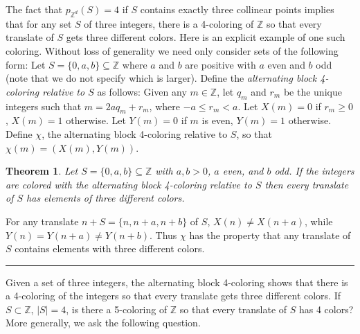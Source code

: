 \documentclass[12pt]{article}
\newenvironment{proof}{{\bf Proof:  }}{\hfill\rule{2mm}{2mm}}
\newtheorem{theorem}{Theorem}
\newcommand{\Z}{\ensuremath{\mathbb Z}}
\begin{document}
The fact that $p_{\Z^d}(S)=4$ if $S$ contains exactly three collinear points implies that for any set $S$ of three integers, there is a 4-coloring of $\Z$ so that every translate of $S$ gets three different colors. Here is an explicit example of one such coloring. Without loss of generality we need only consider sets of the following form: Let $S=\{0,a,b\} \subseteq \Z$ where $a$ and $b$ are positive with $a$ even and $b$ odd (note that we do not specify which is larger). Define the \textit{alternating block 4-coloring relative to $S$} as follows: Given any $m \in \Z$, let $q_m$ and $r_m$ be the unique integers such that $m=2aq_m+r_m$, where $-a\le r_m <a$. Let $X(m)=0$ if $r_m \ge 0$, $X(m)=1$ otherwise.  Let $Y(m)=0$ if $m$ is even, $Y(m)=1$ otherwise.  Define $\chi$, the alternating block 4-coloring relative to $S$, so that $\chi(m) = (X(m),Y(m))$. 

\begin{theorem}
Let  $S=\{0,a,b\} \subseteq \Z$ with $a, b >0$, $a$ even, and $b$ odd. If the integers are colored with the alternating block 4-coloring relative to $S$ then every translate of $S$ has elements of three different colors.
\end{theorem}
\begin{proof}
For any translate $n+S = \{n, n+a, n+b\}$ of $S$, $X(n)\neq X(n+a)$, while $Y(n) = Y(n+a) \neq Y(n+b)$. Thus $\chi$ has the property that any translate of $S$ contains elements with three different colors.
\end{proof}



Given a set of three integers, the alternating block 4-coloring shows that there is a 4-coloring of the integers so that every translate gets three different colors. If $S\subset \Z$, $|S|=4$, is there a 5-coloring of $\Z$ so that every translate of $S$ has 4 colors? More generally, we ask the following question.%
\end{document}
